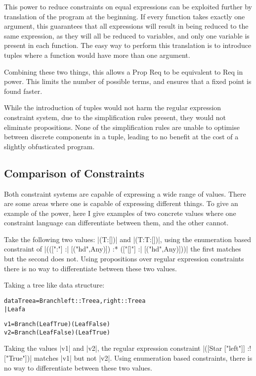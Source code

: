 \documentclass[preprint]{sigplanconf}
\newcommand{\C}[1]{\textsf{#1}}
\newenvironment{code}{\begin{alltt}\small}{\end{alltt}}
\begin{document}
This power to reduce constraints on equal expressions can be exploited further by translation of the program at the beginning. If every function takes exactly one argument, this guarantees that all expressions will result in being reduced to the same expression, as they will all be reduced to variables, and only one variable is present in each function. The easy way to perform this translation is to introduce tuples where a function would have more than one argument.

Combining these two things, this allows a \C{Prop Req} to be equivalent to \C{Req} in power. This limits the number of possible terms, and ensures that a fixed point is found faster.

While the introduction of tuples would not harm the regular expression constraint system, due to the simplification rules present, they would not eliminate propositions. None of the simplification rules are unable to optimise between discrete components in a tuple, leading to no benefit at the cost of a slightly obfusticated program.

\subsection{Comparison of Constraints}

Both constraint systems are capable of expressing a wide range of values. There are some areas where one is capable of expressing different things. To give an example of the power, here I give examples of two concrete values where one constraint language can differentiate between them, and the other cannot.

Take the following two values: |(T:[])| and |(T:T:[])|, using the enumeration based constraint of |(([":"] :| [("hd",Any)]) :* (["[]"] :| [("hd",Any)]))| the first matches but the second does not. Using propositions over regular expression constraints there is no way to differentiate between these two values.

Taking a tree like data structure:

\begin{code}
data Tree a  =  Branch {left :: Tree a, right :: Tree a}
             |  Leaf a

v1 = Branch (Leaf True   ) (Leaf False  )
v2 = Branch (Leaf False  ) (Leaf True   )
\end{code}

Taking the values |v1| and |v2|, the regular expression constraint |([Star ["left"]] :! ["True"])| matches |v1| but not |v2|. Using enumeration based constraints, there is no way to differentiate between these two values.
\end{document}
